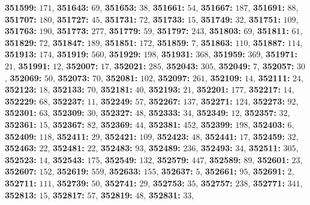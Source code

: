 \textsf{\bfseries 351599:} $171$, \textsf{\bfseries 351643:} $69$, \textsf{\bfseries 351653:} $38$, \textsf{\bfseries 351661:} $54$, \textsf{\bfseries 351667:} $187$, \textsf{\bfseries 351691:} $88$, \textsf{\bfseries 351707:} $180$, \textsf{\bfseries 351727:} $45$, \textsf{\bfseries 351731:} $72$, \textsf{\bfseries 351733:} $15$, \textsf{\bfseries 351749:} $32$, \textsf{\bfseries 351751:} $109$, \textsf{\bfseries 351763:} $190$, \textsf{\bfseries 351773:} $277$, \textsf{\bfseries 351779:} $59$, \textsf{\bfseries 351797:} $243$, \textsf{\bfseries 351803:} $69$, \textsf{\bfseries 351811:} $61$, \textsf{\bfseries 351829:} $72$, \textsf{\bfseries 351847:} $189$, \textsf{\bfseries 351851:} $172$, \textsf{\bfseries 351859:} $7$, \textsf{\bfseries 351863:} $110$, \textsf{\bfseries 351887:} $114$, \textsf{\bfseries 351913:} $174$, \textsf{\bfseries 351919:} $560$, \textsf{\bfseries 351929:} $198$, \textsf{\bfseries 351931:} $368$, \textsf{\bfseries 351959:} $369$, \textsf{\bfseries 351971:} $21$, \textsf{\bfseries 351991:} $12$, \textsf{\bfseries 352007:} $17$, \textsf{\bfseries 352021:} $285$, \textsf{\bfseries 352043:} $305$, \textsf{\bfseries 352049:} $7$, \textsf{\bfseries 352057:} $30$, \textsf{\bfseries 352069:} $50$, \textsf{\bfseries 352073:} $70$, \textsf{\bfseries 352081:} $102$, \textsf{\bfseries 352097:} $261$, \textsf{\bfseries 352109:} $14$, \textsf{\bfseries 352111:} $24$, \textsf{\bfseries 352123:} $18$, \textsf{\bfseries 352133:} $70$, \textsf{\bfseries 352181:} $40$, \textsf{\bfseries 352193:} $21$, \textsf{\bfseries 352201:} $177$, \textsf{\bfseries 352217:} $14$, \textsf{\bfseries 352229:} $68$, \textsf{\bfseries 352237:} $11$, \textsf{\bfseries 352249:} $57$, \textsf{\bfseries 352267:} $137$, \textsf{\bfseries 352271:} $124$, \textsf{\bfseries 352273:} $92$, \textsf{\bfseries 352301:} $63$, \textsf{\bfseries 352309:} $30$, \textsf{\bfseries 352327:} $48$, \textsf{\bfseries 352333:} $34$, \textsf{\bfseries 352349:} $12$, \textsf{\bfseries 352357:} $32$, \textsf{\bfseries 352361:} $15$, \textsf{\bfseries 352367:} $82$, \textsf{\bfseries 352369:} $44$, \textsf{\bfseries 352381:} $452$, \textsf{\bfseries 352399:} $198$, \textsf{\bfseries 352403:} $6$, \textsf{\bfseries 352409:} $118$, \textsf{\bfseries 352411:} $29$, \textsf{\bfseries 352421:} $109$, \textsf{\bfseries 352423:} $48$, \textsf{\bfseries 352441:} $17$, \textsf{\bfseries 352459:} $32$, \textsf{\bfseries 352463:} $22$, \textsf{\bfseries 352481:} $22$, \textsf{\bfseries 352483:} $93$, \textsf{\bfseries 352489:} $236$, \textsf{\bfseries 352493:} $34$, \textsf{\bfseries 352511:} $305$, \textsf{\bfseries 352523:} $14$, \textsf{\bfseries 352543:} $175$, \textsf{\bfseries 352549:} $132$, \textsf{\bfseries 352579:} $447$, \textsf{\bfseries 352589:} $89$, \textsf{\bfseries 352601:} $23$, \textsf{\bfseries 352607:} $152$, \textsf{\bfseries 352619:} $559$, \textsf{\bfseries 352633:} $155$, \textsf{\bfseries 352637:} $5$, \textsf{\bfseries 352661:} $95$, \textsf{\bfseries 352691:} $2$, \textsf{\bfseries 352711:} $111$, \textsf{\bfseries 352739:} $50$, \textsf{\bfseries 352741:} $29$, \textsf{\bfseries 352753:} $35$, \textsf{\bfseries 352757:} $238$, \textsf{\bfseries 352771:} $341$, \textsf{\bfseries 352813:} $15$, \textsf{\bfseries 352817:} $57$, \textsf{\bfseries 352819:} $48$, \textsf{\bfseries 352831:} $33$, 
